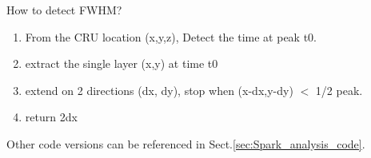 How to detect FWHM? 
\begin{enumerate}
  \item From the CRU location (x,y,z), Detect the time at peak t0.
   \item extract the single layer (x,y) at time t0
   \item extend on 2 directions (dx, dy), stop when (x-dx,y-dy) $<$ 1/2 peak. 
   \item return 2dx
\end{enumerate}


Other code versions can be referenced in Sect.\ref{sec:Spark_analysis_code}.

% 


% 
% 
% 


